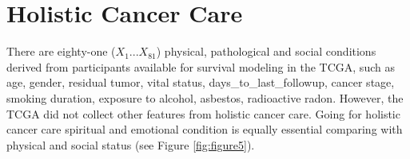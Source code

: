 \documentclass[12pt, a4paper]{article}
\begin{document}












\section{Holistic Cancer Care}



There are eighty-one ($X_1 ... X_{81}$) physical, pathological and social conditions derived from participants available for survival modeling in the TCGA, %
such as age, gender, residual tumor, vital status, days\_to\_last\_followup, cancer stage, smoking duration, exposure to alcohol, asbestos, radioactive radon. 
However, the TCGA did not collect other features from holistic cancer care.
Going for holistic cancer care\citep{Mehta2019}\citep{Iftikhar2021} spiritual and emotional condition is equally essential comparing with physical and social status (see Figure \ref{fig:figure5}).
\end{document}
